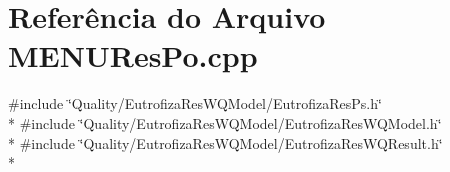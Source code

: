 \section{Referência do Arquivo M\+E\+N\+U\+Res\+Po.\+cpp}
\label{_m_e_n_u_res_po_8cpp}
{\ttfamily \#include \char`\"{}Quality/\+Eutrofiza\+Res\+W\+Q\+Model/\+Eutrofiza\+Res\+Ps.\+h\char`\"{}}\\*
{\ttfamily \#include \char`\"{}Quality/\+Eutrofiza\+Res\+W\+Q\+Model/\+Eutrofiza\+Res\+W\+Q\+Model.\+h\char`\"{}}\\*
{\ttfamily \#include \char`\"{}Quality/\+Eutrofiza\+Res\+W\+Q\+Model/\+Eutrofiza\+Res\+W\+Q\+Result.\+h\char`\"{}}\\*
